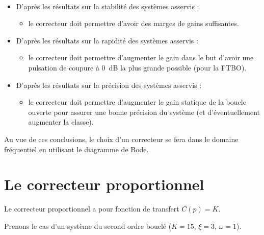 \documentclass[10pt,fleqn]{article} %
\begin{document}
\begin{resultat} ~\\

\begin{itemize}
\item D'après les résultats sur la stabilité des systèmes asservis :
\begin{itemize}
\item le correcteur doit permettre d'avoir des marges de gains suffisantes.
\end{itemize}
\item D'après les résultats sur la rapidité des systèmes asservis :
\begin{itemize}
\item le correcteur doit permettre d'augmenter le gain dans le but d'avoir une pulsation de coupure à \SI{0}{dB} la plus grande possible (pour la FTBO).
\end{itemize}
\item D'après les résultats sur la précision des systèmes asservis :
\begin{itemize}
\item le correcteur doit permettre d'augmenter le gain statique de la boucle ouverte pour assurer une bonne précision du système (et d’éventuellement augmenter la classe).
\end{itemize}
\end{itemize}

Au vue de ces conclusions, le choix d'un correcteur se fera dans le domaine fréquentiel en utilisant le diagramme de Bode. 
\end{resultat}

\newpage

\section{Le correcteur proportionnel}

\begin{defi}

Le correcteur proportionnel a pour fonction de transfert $C(p)=K$.

\end{defi}

Prenons le cas d'un système du second ordre bouclé ($K=15$, $\xi=3$, $\omega=1$).
\end{document}
